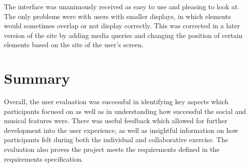 The interface was unanimously received as easy to use and pleasing to look at. The only problems were with users with smaller displays, in which elements would sometimes overlap or not display correctly. This was corrected in a later version of the site by adding media queries and changing the position of certain elements based on the site of the user’s screen.

\section{Summary}
Overall, the user evaluation was successful in identifying key aspects which participants focused on as well as in understanding how successful the social and musical features were. There was useful feedback which allowed for further development into the user experience, as well as insightful information on how participants felt during both the individual and collaborative exercise. The evaluation also proves the project meets the requirements defined in the requirements specification.